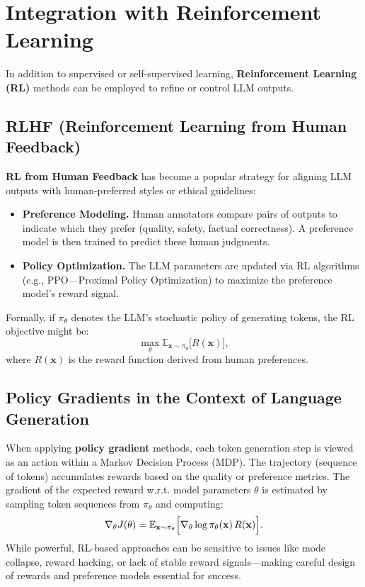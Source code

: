 \section{Integration with Reinforcement Learning}
\label{sec:rl_integration}

\noindent
In addition to supervised or self-supervised learning, \textbf{Reinforcement Learning (RL)} methods can be employed to refine or control LLM outputs. 

\subsection{RLHF (Reinforcement Learning from Human Feedback)}
\noindent
\textbf{RL from Human Feedback} has become a popular strategy for aligning LLM outputs with human-preferred styles or ethical guidelines:
\begin{itemize}
    \item \textbf{Preference Modeling.} Human annotators compare pairs of outputs to indicate which they prefer (quality, safety, factual correctness). A preference model is then trained to predict these human judgments.
    \item \textbf{Policy Optimization.} The LLM parameters are updated via RL algorithms (e.g., PPO—Proximal Policy Optimization) to maximize the preference model’s reward signal.
\end{itemize}
Formally, if \(\pi_{\theta}\) denotes the LLM’s stochastic policy of generating tokens, the RL objective might be:
\[
\max_{\theta} \mathbb{E}_{\mathbf{x} \sim \pi_{\theta}} \bigl[R(\mathbf{x})\bigr],
\]
where \(R(\mathbf{x})\) is the reward function derived from human preferences.

\subsection{Policy Gradients in the Context of Language Generation}
\noindent
When applying \textbf{policy gradient} methods, each token generation step is viewed as an action within a Markov Decision Process (MDP). The trajectory (sequence of tokens) accumulates rewards based on the quality or preference metrics. The gradient of the expected reward w.r.t. model parameters \(\theta\) is estimated by sampling token sequences from \(\pi_{\theta}\) and computing:
\[
\nabla_{\theta} J(\theta) = 
\mathbb{E}_{\mathbf{x} \sim \pi_{\theta}} \Bigl[\nabla_{\theta} \log \pi_{\theta}(\mathbf{x})\,R(\mathbf{x})\Bigr].
\]
While powerful, RL-based approaches can be sensitive to issues like mode collapse, reward hacking, or lack of stable reward signals—making careful design of rewards and preference models essential for success.

